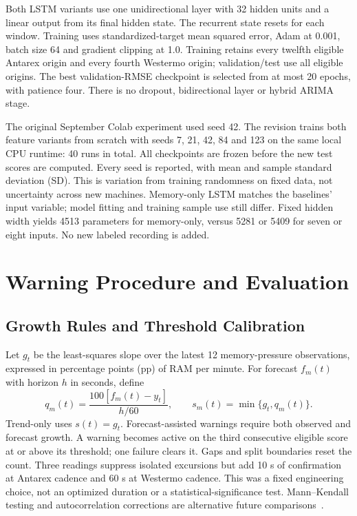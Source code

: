 \documentclass{llncs}
\begin{document}
Both LSTM variants use one unidirectional layer with 32 hidden units and a linear output from its final hidden state. The recurrent state resets for each window. Training uses standardized-target mean squared error, Adam at 0.001, batch size 64 and gradient clipping at 1.0. Training retains every twelfth eligible Antarex origin and every fourth Westermo origin; validation/test use all eligible origins. The best validation-RMSE checkpoint is selected from at most 20 epochs, with patience four. There is no dropout, bidirectional layer or hybrid ARIMA stage.

The original September Colab experiment used seed 42. The revision trains both feature variants from scratch with seeds 7, 21, 42, 84 and 123 on the same local CPU runtime: 40 runs in total. All checkpoints are frozen before the new test scores are computed. Every seed is reported, with mean and sample standard deviation (SD). This is variation from training randomness on fixed data, not uncertainty across new machines. Memory-only LSTM matches the baselines' input variable; model fitting and training sample use still differ. Fixed hidden width yields 4513 parameters for memory-only, versus 5281 or 5409 for seven or eight inputs. No new labeled recording is added.

\section{Warning Procedure and Evaluation}
\subsection{Growth Rules and Threshold Calibration}
Let $g_t$ be the least-squares slope over the latest 12 memory-pressure observations, expressed in percentage points (pp) of RAM per minute. For forecast $f_m(t)$ with horizon $h$ in seconds, define
\begin{equation}
q_m(t)=\frac{100[f_m(t)-y_t]}{h/60},\qquad
s_m(t)=\min\{g_t,q_m(t)\}.
\label{eq:score}
\end{equation}
Trend-only uses $s(t)=g_t$. Forecast-assisted warnings require both observed and forecast growth. A warning becomes active on the third consecutive eligible score at or above its threshold; one failure clears it. Gaps and split boundaries reset the count. Three readings suppress isolated excursions but add 10 s of confirmation at Antarex cadence and 60 s at Westermo cadence. This was a fixed engineering choice, not an optimized duration or a statistical-significance test. Mann--Kendall testing and autocorrelation corrections are alternative future comparisons~\cite{ref33,ref35}.
\end{document}

